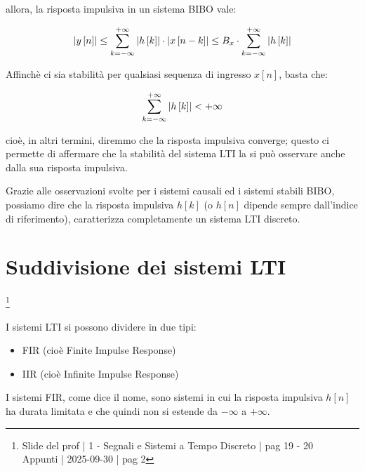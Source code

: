 allora, la risposta impulsiva in un sistema BIBO vale: 

{
    \Large 
    \begin{equation}
        \abs{y \left[ n\right]}
        \leq 
        \sum_{k = - \infty}^{+ \infty}
        \abs{h \left[ k\right]}
        \cdot 
        \abs{x \left[ n - k\right]}
        \leq 
        B_x 
        \cdot 
        \sum_{k = - \infty }^{+ \infty}
        \abs{h \left[ k\right]}
    \end{equation}
}

Affinchè ci sia stabilità per qualsiasi sequenza di ingresso $x \left[ n\right]$, 
basta che: 

{
    \Large 
    \begin{equation}
        \sum_{k = - \infty }^{+ \infty}
        \abs{h \left[ k\right]}
        < 
        + \infty
    \end{equation}
}

cioè, in altri termini, diremmo che la risposta impulsiva converge; 
questo ci permette di affermare che la stabilità del sistema LTI la si può osservare anche dalla sua risposta impulsiva. \newline 

Grazie alle osservazioni svolte per i sistemi causali ed i sistemi stabili BIBO, 
possiamo dire che la risposta impulsiva $h \left[ k\right]$ (o $h \left[ n\right]$ dipende sempre dall'indice di riferimento), 
caratterizza completamente un sistema LTI discreto. \newline 

\newpage 

\section{Suddivisione dei sistemi LTI}

\footnote{ 
    Slide del prof | 1 - Segnali e Sistemi a Tempo Discreto | pag 19 - 20\\
    Appunti | 2025-09-30 | pag 2
}

I sistemi LTI si possono dividere in due tipi: 

\begin{itemize}
    \item FIR (cioè Finite Impulse Response) 
    \item IIR (cioè Infinite Impulse Response)
\end{itemize}

I sistemi FIR, come dice il nome, sono sistemi in cui la risposta impulsiva $h \left[ n\right]$ 
ha durata limitata e che quindi non si estende da $- \infty$ a $+ \infty$. \newline 

